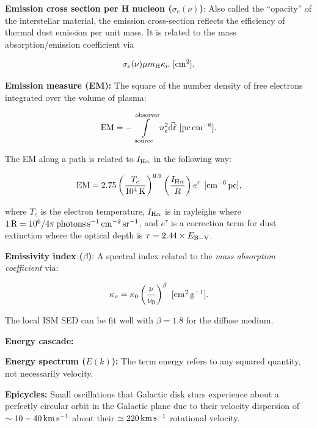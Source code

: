 \documentclass[a4paper,10pt]{article}
\begin{document}
{\noindent}\textbf{Emission cross section per H nucleon ($\sigma_e(\nu)$)}: Also called the ``opacity'' of the interstellar material, the emission cross-section reflects the efficiency of thermal dust emission per unit mass. It is related to the mass absorption/emission coefficient via

\begin{align*}
    \sigma_e(\nu) \mu m_{\rm H}\kappa_\nu ~ [{\rm cm^2}].
\end{align*}

{\noindent}\textbf{Emission measure (EM):} The square of the number density of free electrons integrated over the volume of plasma:

\begin{align*}
    {\rm EM} = -\int\limits_\mathrm{source}^\mathrm{observer} n_e^2\vec{{\rm d}\ell} ~ [{\rm pc\,cm^{-6}}].
\end{align*}

{\noindent}The EM along a path is related to $I_{\rm H\alpha}$ in the following way:

\begin{align*}
    {\rm EM} = 2.75 \left(\frac{T_e}{10^4\,{\rm K}}\right)^{0.9} \left(\frac{I_{\rm H\alpha}}{R}\right) e^\tau ~ [{\rm cm^{-6}\,pc}],
\end{align*}

{\noindent}where $T_e$ is the electron temperature, $I_{\rm H\alpha}$ is in rayleighs where $1\,{\rm R} = 10^6/4\pi\,{\rm photons\,s^{-1}\,cm^{-2}\,sr^{-1}}$, and $e^\tau$ is a correction term for dust extinction where the optical depth is $\tau=2.44\times E_{\rm B-V}$.

{\noindent}\textbf{Emissivity index ($\beta$)}: A spectral index related to the \textit{mass absorption coefficient} via:

\begin{align*}
    \kappa_\nu = \kappa_0 \left(\frac{\nu}{\nu_0}\right)^\beta ~ [{\rm cm^2\,g^{-1}}].
\end{align*}

{\noindent}The local ISM SED can be fit well with $\beta = 1.8$ for the diffuse medium.

{\noindent}\textbf{Energy cascade:}

{\noindent}\textbf{Energy spectrum ($E(k)$):} The term energy refers to any squared quantity, not necessarily velocity.

{\noindent}\textbf{Epicycles:} Small oscillations that Galactic disk stars experience about a perfectly circular orbit in the Galactic plane due to their velocity dispersion of $\sim10-40\,{\rm km\,s^{-1}}$ about their $\simeq220\,{\rm km\,s^{-1}}$ rotational velocity.
\end{document}
